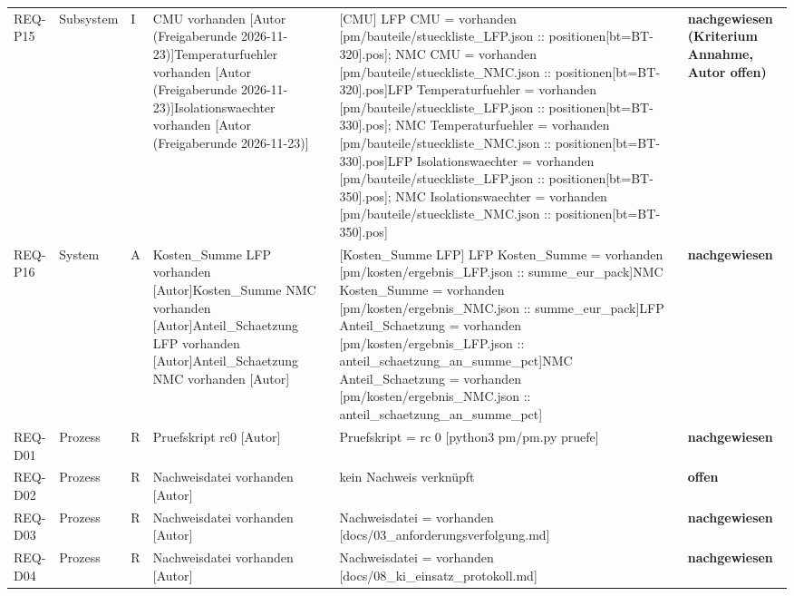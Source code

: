 \begin{longtable}{p{1.7cm}p{1.6cm}p{1.2cm}p{3.2cm}p{4.8cm}p{2.6cm}}
REQ-P15 & Subsystem & I & CMU vorhanden [Autor (Freigaberunde 2026-11-23)]\newline Temperaturfuehler vorhanden [Autor (Freigaberunde 2026-11-23)]\newline Isolationswaechter vorhanden [Autor (Freigaberunde 2026-11-23)] & [CMU] LFP CMU = vorhanden [pm/bauteile/stueckliste\_LFP.json :: positionen[bt=BT-320].pos]; NMC CMU = vorhanden [pm/bauteile/stueckliste\_NMC.json :: positionen[bt=BT-320].pos]\newline [Temperaturfuehler] LFP Temperaturfuehler = vorhanden [pm/bauteile/stueckliste\_LFP.json :: positionen[bt=BT-330].pos]; NMC Temperaturfuehler = vorhanden [pm/bauteile/stueckliste\_NMC.json :: positionen[bt=BT-330].pos]\newline [Isolationswaechter] LFP Isolationswaechter = vorhanden [pm/bauteile/stueckliste\_LFP.json :: positionen[bt=BT-350].pos]; NMC Isolationswaechter = vorhanden [pm/bauteile/stueckliste\_NMC.json :: positionen[bt=BT-350].pos] & \textbf{nachgewiesen (Kriterium Annahme, Autor offen)}\\
REQ-P16 & System & A & Kosten\_Summe LFP vorhanden [Autor]\newline Kosten\_Summe NMC vorhanden [Autor]\newline Anteil\_Schaetzung LFP vorhanden [Autor]\newline Anteil\_Schaetzung NMC vorhanden [Autor] & [Kosten\_Summe LFP] LFP Kosten\_Summe = vorhanden [pm/kosten/ergebnis\_LFP.json :: summe\_eur\_pack] NMC Kosten\_Summe = vorhanden [pm/kosten/ergebnis\_NMC.json :: summe\_eur\_pack] LFP Anteil\_Schaetzung = vorhanden [pm/kosten/ergebnis\_LFP.json :: anteil\_schaetzung\_an\_summe\_pct] NMC Anteil\_Schaetzung = vorhanden [pm/kosten/ergebnis\_NMC.json :: anteil\_schaetzung\_an\_summe\_pct] & \textbf{nachgewiesen}\\
REQ-D01 & Prozess & R & Pruefskript rc0 [Autor] & Pruefskript = rc 0 [python3 pm/pm.py pruefe] & \textbf{nachgewiesen}\\
REQ-D02 & Prozess & R & Nachweisdatei vorhanden [Autor] & kein Nachweis verknüpft & \textbf{offen}\\
REQ-D03 & Prozess & R & Nachweisdatei vorhanden [Autor] & Nachweisdatei = vorhanden [docs/03\_anforderungsverfolgung.md] & \textbf{nachgewiesen}\\
REQ-D04 & Prozess & R & Nachweisdatei vorhanden [Autor] & Nachweisdatei = vorhanden [docs/08\_ki\_einsatz\_protokoll.md] & \textbf{nachgewiesen}\\

\end{longtable}

